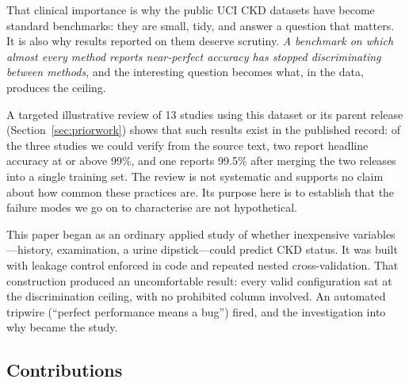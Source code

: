\documentclass[conference]{IEEEtran}
\begin{document}
That clinical importance is why the public UCI CKD datasets have become
standard benchmarks: they are small, tidy, and answer a question that matters.
It is also why results reported on them deserve scrutiny. \emph{A benchmark on
which almost every method reports near-perfect accuracy has stopped
discriminating between methods}, and the interesting question becomes what, in
the data, produces the ceiling.

A targeted illustrative review of 13 studies using this dataset or its parent
release (Section~\ref{sec:priorwork}) shows that such results exist in the
published record: of the three studies we could verify from the source text,
two report headline accuracy at or above 99\%, and one reports 99.5\% after
merging the two releases into a single training set. The review is not
systematic and supports no claim about how common these practices are. Its
purpose here is to establish that the failure modes we go on to characterise
are not hypothetical.

This paper began as an ordinary applied study of whether inexpensive
variables---history, examination, a urine dipstick---could predict CKD status.
It was built with leakage control enforced in code and repeated nested
cross-validation. That construction produced an uncomfortable result: every
valid configuration sat at the discrimination ceiling, with no prohibited
column involved. An automated tripwire (``perfect performance means a bug'')
fired, and the investigation into why became the study.

\subsection{Contributions}
\end{document}
